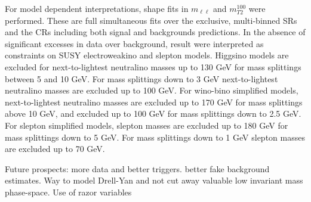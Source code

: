 For model dependent interpretations, shape fits in $m_{\ell\ell}$ and $m_{T2}^{100}$ were performed.  These are full simultaneous fits over the exclusive, multi-binned SRs and the CRs including both signal and backgrounds predictions.  In the absence of significant excesses in data over background, result were interpreted as constraints on SUSY electroweakino and slepton models.  Higgsino models are excluded for next-to-lightest neutralino masses up to 130 GeV for mass splittings between 5 and 10 GeV. For mass splittings down to 3 GeV next-to-lightest neutralino masses are excluded up to 100 GeV.  For wino-bino simplified models, next-to-lightest neutralino masses are excluded up to 170 GeV for mass splittings above 10 GeV, and excluded up to 100 GeV for mass splittings down to 2.5 GeV.  For slepton simplified models, slepton masses are excluded up to 180 GeV for mass splittings down to 5 GeV. For mass splittings down to 1 GeV slepton masses are excluded up to 70 GeV.

Future prospects: more data and better triggers. better fake background estimates.  Way to model Drell-Yan and not cut away valuable low invariant mass phase-space.  Use of razor variables



